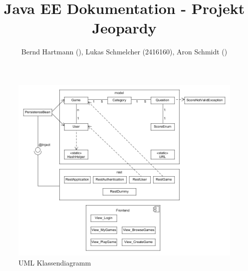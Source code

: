\documentclass[a4paper, 12pt, oneside]{article}
\title{Java EE Dokumentation - Projekt Jeopardy}
\author{Bernd Hartmann (), Lukas Schmelcher (2416160), Aron Schmidt ()}
\begin{document}
\maketitle

\begin{figure}[ht]
	\centering
	\includegraphics[scale=0.45]{images/umlclassdiagram.png}
	\caption{UML Klassendiagramm}
	\label{fig:umlclassdiagram}
\end{figure}
\end{document}
